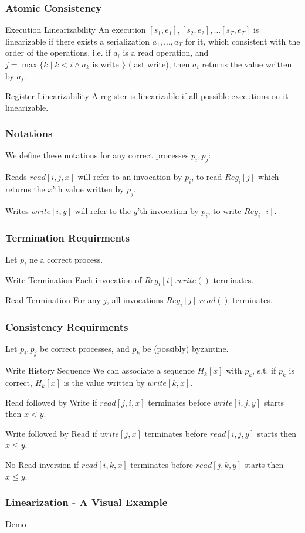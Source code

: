 \begin{frame}
    \frametitle{Atomic Consistency}
    \begin{block}{Execution Linearizability}
        An execution $[s_1, e_1], [s_2, e_2], ... [s_T, e_T]$
        is linearizable if there exists a serialization $a_1,...,a_T$ for it,
        which consistent with the order of the operations, i.e.
        if $a_i$ is a read operation, and $j=\max\{k\mid k<i\wedge a_k\text{ is write }\}$ (last write),
        then $a_i$ returns the value written by $a_j$.
    \end{block}
    \begin{alertblock}{Register Linearizability}
        A register is linearizable if all possible executions on it linearizable.
    \end{alertblock}
\end{frame}
\begin{frame}
    \frametitle{Notations}
    We define these notations for any correct processes $p_i, p_j$:
    \begin{block}{Reads}
        $read[i,j,x]$ will refer to an invocation by $p_i$, to read $Reg_i[j]$
        which returns the $x$'th value written by $p_j$.
    \end{block}
    \begin{block}{Writes}
        $write[i,y]$ will refer to the $y$'th invocation by $p_i$, to write $Reg_i[i]$.
    \end{block}

\end{frame}
\begin{frame}
    \frametitle{Termination Requirments}
    Let $p_i$ ne a correct process.
    \begin{block}{Write Termination}
        Each invocation of $Reg_i[i].write()$ terminates.
    \end{block}
    \begin{block}{Read Termination}
        For any $j$, all invocations $Reg_i[j].read()$ terminates.
    \end{block}
\end{frame}
\begin{frame}
    \frametitle{Consistency Requirments}
    Let $p_i, p_j$ be correct processes, and $p_k$ be (possibly) byzantine.
    \begin{block}{Write History Sequence}
        We can associate a sequence $H_k[x]$ with $p_k$, s.t. if $p_k$ is correct,
        $H_k[x]$ is the value written by $write[k,x]$.
    \end{block}
    \begin{block}{Read followed by Write}
        if $read[j,i,x]$ terminates before $write[i,j,y]$ starts then $x<y$.
    \end{block}
    \begin{block}{Write followed by Read}
        if $write[j,x]$ terminates before $read[i,j,y]$ starts then $x\leq y$.
    \end{block}
    \begin{block}{No Read inversion}
        if $read[i,k,x]$ terminates before $read[j,k,y]$ starts then $x\leq y$.
    \end{block}    
\end{frame}

\begin{frame}
    \frametitle{Linearization - A Visual Example}
    \begin{center}
        \href{https://www.desmos.com/calculator/v2ltnxcko2}{Demo}
    \end{center}
\end{frame}